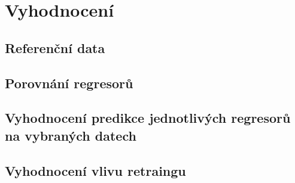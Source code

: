 \chapter{Vyhodnocení}
\section{Referenční data}
\section{Porovnání regresorů}
\section{Vyhodnocení predikce jednotlivých regresorů na vybraných datech}
\section{Vyhodnocení vlivu retraingu}